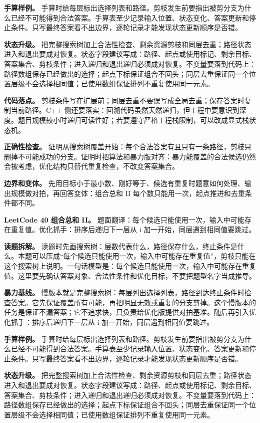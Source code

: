 \textbf{手算样例。} 手算时给每层标出选择列表和路径。剪枝发生前要指出被剪分支为什么已经不可能得到合法答案。手算表至少记录输入位置、状态变化、答案更新和停止条件。只写最终答案看不出边界，逐轮记录才能发现状态更新顺序是否错。

\textbf{状态升级。} 把完整搜索树加上合法性检查、剩余资源剪枝和同层去重；路径状态进入和退出要成对恢复。状态字段建议写成：路径、起点或使用标记、剩余目标、答案集合、剪枝条件；进入递归和退出递归必须成对恢复。不变量要落到代码上：路径数组保存已经做出的选择；起点下标保证组合不回头；同层去重保证同一个位置层级不会选择相同值；已使用数组保证排列不重复使用同一元素。

\textbf{代码落点。} 剪枝条件写在扩展前；同层去重不要误写成全局去重；保存答案时复制当前路径。C++ 侧还要落实：回溯代码虽然天然递归，但工程中要意识到深度。题目规模较小时递归可读性好；若要遵守严格工程栈限制，可以改成显式栈状态机。

\textbf{正确性检查。} 证明从搜索树覆盖开始：每个合法答案有且只有一条路径，剪枝只删掉不可能成功的分支。证明时把算法和暴力版对齐：暴力能覆盖的合法候选仍然会被考虑，优化结构只替代重复检查，不改变答案集合。

\textbf{边界和变体。} 先用目标小于最小数、刚好等于、候选有重复时题意如何处理、输出规模做对拍，再回答变体：组合总和 II 每个数只能用一次，起点推进和去重条件都不同。

\noindent\textbf{LeetCode 40 组合总和 II。} 题面翻译：每个候选只能使用一次，输入中可能存在重复值。优化抓手：排序后递归下一层从 i 加一开始，同层遇到相同值要跳过。

\textbf{读题拆解。} 读题时先画搜索树：层数代表什么，路径保存什么，终止条件是什么。本题可以压成“每个候选只能使用一次，输入中可能存在重复值”，剪枝只能在这个搜索树上说明。一句话模型是：每个候选只能使用一次，输入中可能存在重复值。这里要先确认答案对象、合法性条件和优化目标，不要把题型名字当成推导。

\textbf{暴力基线。} 慢版本就是完整搜索树：每层列出选择列表，路径到达终止条件时检查答案。它先保证覆盖所有可能，再把明显无效或重复的分支剪掉。这个慢版本的任务是保证不漏答案；它不追求快，只负责给优化版提供对拍基准。随后再引入优化抓手：排序后递归下一层从 i 加一开始，同层遇到相同值要跳过。

\textbf{手算样例。} 手算时给每层标出选择列表和路径。剪枝发生前要指出被剪分支为什么已经不可能得到合法答案。手算表至少记录输入位置、状态变化、答案更新和停止条件。只写最终答案看不出边界，逐轮记录才能发现状态更新顺序是否错。

\textbf{状态升级。} 把完整搜索树加上合法性检查、剩余资源剪枝和同层去重；路径状态进入和退出要成对恢复。状态字段建议写成：路径、起点或使用标记、剩余目标、答案集合、剪枝条件；进入递归和退出递归必须成对恢复。不变量要落到代码上：路径数组保存已经做出的选择；起点下标保证组合不回头；同层去重保证同一个位置层级不会选择相同值；已使用数组保证排列不重复使用同一元素。

